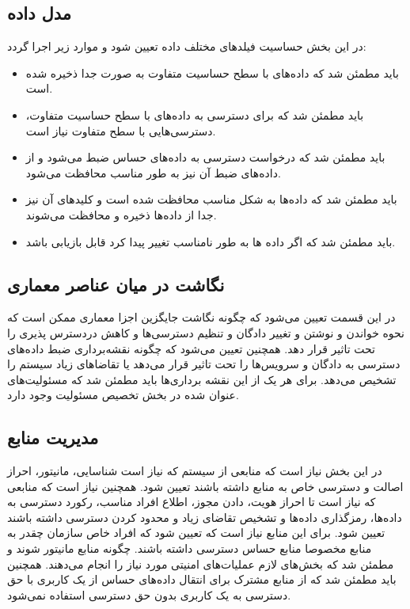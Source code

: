 \subsection{مدل داده}
در این بخش حساسیت فیلد‌های مختلف داده تعیین شود و موارد زیر اجرا گردد:
\begin{itemize}
\item
باید مطمئن شد که داده‌های با سطح حساسیت متفاوت به صورت جدا ذخیره شده است.
\item
باید مطمئن شد که برای دسترسی به داده‌های با سطح حساسیت متفاوت، دسترسی‌هایی با سطح متفاوت نیاز است.
\item
باید مطمئن شد که درخواست دسترسی به داده‌های حساس ضبط می‌شود و از داده‌های ضبط آن نیز به طور مناسب محافظت می‌شود.
\item 
باید مطمئن شد که داده‌ها به شکل مناسب محافظت شده است و کلید‌های آن نیز جدا از داده‌ها  ذخیره و محافظت می‌شوند.
\item
باید مطمئن شد که اگر داده ‌ها به طور نامناسب تغییر پیدا کرد قابل بازیابی باشد.
\end{itemize}

\subsection{نگاشت در میان عناصر معماری}
در این قسمت تعیین می‌شود که چگونه نگاشت جایگزین اجزا معماری ممکن است که نحوه خواندن و نوشتن و تغییر دادگان و تنظیم دسترسی‌ها و کاهش دردسترس پذیری را تحت تاثیر قرار دهد. همچنین 
تعیین می‌شود که چگونه نقشه‌برداری ضبط داده‌های دسترسی به دادگان و سرویس‌ها را تحت تاثیر قرار می‌دهد یا تقاضاهای زیاد سیستم را تشخیص می‌دهد.  
برای هر یک از این نقشه برداری‌ها باید مطمئن شد که مسئولیت‌های عنوان شده در بخش تخصیص مسئولیت وجود دارد.
\subsection{مدیریت منابع}
در این بخش نیاز است که منابعی از سیستم که نیاز است شناسایی، مانیتور، احراز اصالت و دسترسی خاص به منابع داشته باشند تعیین شود.
همچنین نیاز است که منابعی که نیاز است تا احراز هویت، دادن مجوز، اطلاع افراد مناسب، رکورد دسترسی به داده‌ها، رمزگذاری داده‌ها و تشخیص تقاضای زیاد و محدود کردن دسترسی داشته باشند تعیین شود.
برای این منابع نیاز است که تعیین شود که افراد خاص سازمان چقدر به منابع مخصوصا منابع حساس دسترسی داشته باشند. چگونه منابع مانیتور شوند و مطمئن شد که بخش‌های لازم عملیات‌های امنیتی مورد نیاز را انجام می‌دهند. 
همچنین باید مطمئن شد که از منابع مشترک برای انتقال داده‌های حساس از یک کاربری با حق دسترسی به یک کاربری بدون حق دسترسی استفاده نمی‌شود.

